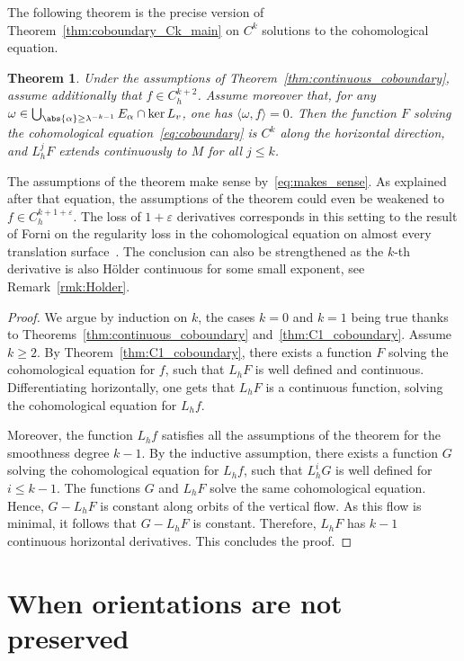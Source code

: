 \documentclass[JEP,XML,SOM,Unicode]{cedram}
\let\epsilon\varepsilon
\newtheorem{thm}{Theorem}[section]
\theoremstyle{definition}
\numberwithin{equation}{section}
\begin{document}
The following theorem is the precise version of
Theorem~\ref{thm:coboundary_Ck_main} on $C^k$ solutions to the cohomological
equation.
\begin{thm}
\label{thm:coboundary_Ck} Under the assumptions of
Theorem~\ref{thm:continuous_coboundary}, assume additionally that $f \in
C^{k+2}_h$. Assume moreover that, for any $\omega \in \bigcup_{\abs{\alpha}
\geq \lambda^{-k-1}} E_\alpha \cap \ker L_v$, one has $\langle \omega, f
\rangle = 0$. Then the function $F$ solving the cohomological
equation~\eqref{eq:coboundary} is $C^k$ along the horizontal direction, and
$L^j_h F$ extends continuously to $M$ for all $j\leq k$.
\end{thm}
The assumptions of the theorem make sense by~\eqref{eq:makes_sense}. As
explained after that equation, the assumptions of the theorem could even be
weakened to $f \in C^{k+1+\epsilon}_h$. The loss of $1+\epsilon$ derivatives
corresponds in this setting to the result of Forni on the regularity loss in
the cohomological equation on almost every translation
surface~\cite{forni_regularity}. The conclusion can also be strengthened as
the $k$-th derivative is also Hölder continuous for some small exponent, see
Remark~\ref{rmk:Holder}.
\begin{proof}
We argue by induction on $k$, the cases $k=0$ and $k=1$ being true thanks to
Theorems~\ref{thm:continuous_coboundary} and~\ref{thm:C1_coboundary}. Assume
$k\geq 2$. By Theorem~\ref{thm:C1_coboundary}, there exists a function $F$
solving the cohomological equation for $f$, such that $L_h F$ is well defined
and continuous. Differentiating horizontally, one gets that $L_h F$ is a
continuous function, solving the cohomological equation for $L_h f$.

Moreover, the function $L_h f$ satisfies all the assumptions of the theorem
for the smoothness degree $k-1$. By the inductive assumption, there exists a
function $G$ solving the cohomological equation for $L_h f$, such that $L_h^i
G$ is well defined for $i \leq k-1$. The functions $G$ and $L_h F$ solve the
same cohomological equation. Hence, $G-L_h F$ is constant along orbits of the
vertical flow. As this flow is minimal, it follows that $G-L_h F$ is
constant. Therefore, $L_h F$ has $k-1$ continuous horizontal derivatives.
This concludes the proof.
\end{proof}

\section{When orientations are not preserved}
\label{sec:orientations}
\end{document}
